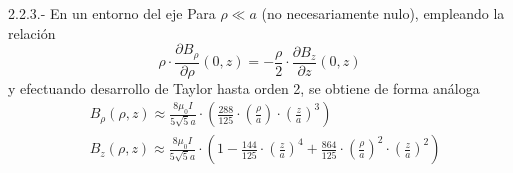 \documentclass{beamer}
\begin{document}
\begin{frame}{2.2.3.- En un entorno del eje}
    Para $\rho \ll a$ (no necesariamente nulo), empleando la relación
    \begin{equation}
        \rho \cdot \frac{\partial B_{\rho}}{\partial \rho} (0,z) = - \frac{\rho}{2} \cdot \frac{\partial B_{z}}{\partial z} (0,z) \nonumber
    \end{equation}
    \pause y efectuando desarrollo de Taylor hasta orden 2, se obtiene de forma análoga
    \begin{align*}
        & B_{\rho}(\rho,z) \approx  \frac{8 \mu_{0} I}{5 \sqrt{5} a} \cdot \left(\frac{288}{125} \cdot \left( \frac{\rho}{a} \right) \cdot \left( \frac{z}{a} \right)^{3} \right)\nonumber \\
        & B_{z}(\rho,z) \approx \frac{8 \mu_{0} I}{5 \sqrt{5} a} \cdot \left( 1 - \frac{144}{125} \cdot \left( \frac{z}{a} \right)^{4} + \frac{864}{125} \cdot \left( \frac{\rho}{a} \right)^{2} \cdot \left( \frac{z}{a} \right)^{2} \right)
    \end{align*}
\end{frame}
\end{document}
